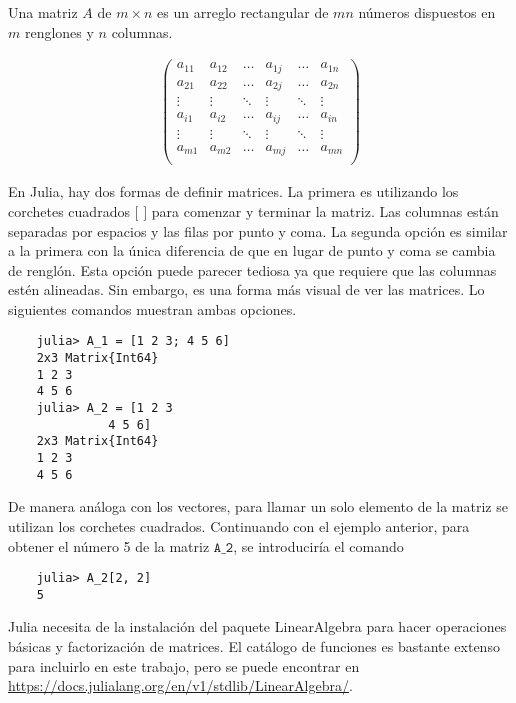 Una matriz $A$ de $m \times n$ es un arreglo rectangular de $mn$ números dispuestos en $m$ renglones y $n$ columnas. 

\begin{equation*}
    \begin{aligned}
    \begin{pmatrix}
    a_{11} & a_{12} & \dots & a_{1j} & \dots & a_{1n} \\
    a_{21} & a_{22} & \dots & a_{2j} & \dots & a_{2n} \\
    \vdots &  \vdots  &  \ddots &  \vdots  & \ddots &\vdots\\
    a_{i1} & a_{i2} & \dots & a_{ij} & \dots & a_{in} \\
    \vdots &  \vdots  &  \ddots &  \vdots  & \ddots &\vdots\\
     a_{m1} & a_{m2} & \dots & a_{mj} & \dots & a_{mn} \\
    \end{pmatrix} 
    \end{aligned}
\end{equation*}

En \textsf{Julia}, hay dos formas de definir matrices. La primera es utilizando los corchetes cuadrados $[$ $]$ para comenzar y terminar la matriz. Las columnas están separadas por espacios y las filas por punto y coma. La segunda opción es similar a la primera con la única diferencia de que en lugar de punto y coma se cambia de renglón. Esta opción puede parecer tediosa ya que requiere que las columnas estén alineadas. Sin embargo, es una forma más visual de ver las matrices. Lo siguientes comandos muestran ambas opciones. 

\begin{verbatim}
	julia> A_1 = [1 2 3; 4 5 6]
	2x3 Matrix{Int64}
	1 2 3
	4 5 6
	julia> A_2 = [1 2 3
		      4 5 6]
	2x3 Matrix{Int64}
	1 2 3
	4 5 6

\end{verbatim}

De manera análoga con los vectores, para llamar un solo elemento de la matriz se utilizan los corchetes cuadrados. Continuando con el ejemplo anterior, para obtener el número 5 de la matriz $\texttt{A\_2}$, se introduciría el comando 
\begin{verbatim}
	julia> A_2[2, 2]
	5
\end{verbatim}

\textsf{Julia} necesita de la instalación del paquete \textsf{LinearAlgebra} para hacer operaciones básicas y factorización de matrices. El catálogo de funciones es bastante extenso para incluirlo en este trabajo, pero se puede encontrar en \url{https://docs.julialang.org/en/v1/stdlib/LinearAlgebra/}.

